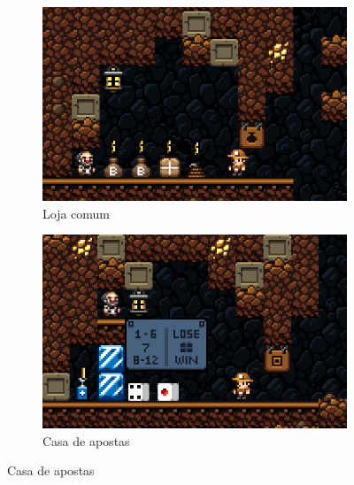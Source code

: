 \begin{figure}[htb!]
\centering
	\begin{subfigure}[b]{0.4\textwidth}
		\includegraphics[width=\textwidth]{fig/spelunky-shop-normal.png}
		\caption{Loja comum}
		\label{fig:spelunky-shop-normal}
	\end{subfigure}
	\begin{subfigure}[b]{0.4\textwidth}
		\includegraphics[width=\textwidth]{fig/spelunky-shop-gamble.png}
		\caption{Casa de apostas}
		\label{fig:spelunky-shop-gamble}
	\end{subfigure}


\end{figure}
